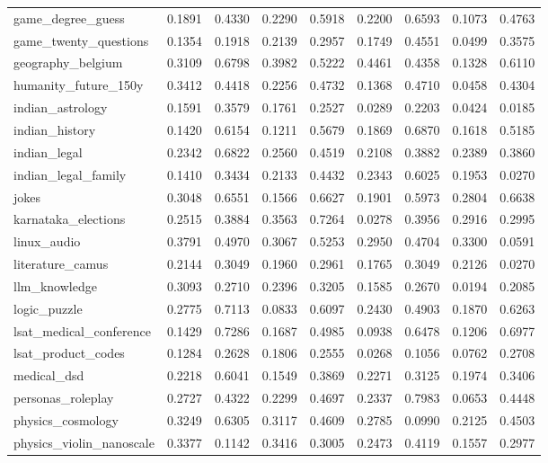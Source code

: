 \documentclass[pdflatex,sn-mathphys-num]{sn-jnl}%
\theoremstyle{thmstyleone}%
\theoremstyle{thmstyletwo}%
\theoremstyle{thmstylethree}%
\begin{document}
\begin{appendices}
\begin{landscape}
\begin{longtable}{@{}p{3.8cm}cccccccc@{}}
game\_degree\_guess & 0.1891 & 0.4330 & 0.2290 & 0.5918 & 0.2200 & 0.6593 & 0.1073 & 0.4763 \\
game\_twenty\_questions & 0.1354 & 0.1918 & 0.2139 & 0.2957 & 0.1749 & 0.4551 & 0.0499 & 0.3575 \\
geography\_belgium & 0.3109 & 0.6798 & 0.3982 & 0.5222 & 0.4461 & 0.4358 & 0.1328 & 0.6110 \\
humanity\_future\_150y & 0.3412 & 0.4418 & 0.2256 & 0.4732 & 0.1368 & 0.4710 & 0.0458 & 0.4304 \\
indian\_astrology & 0.1591 & 0.3579 & 0.1761 & 0.2527 & 0.0289 & 0.2203 & 0.0424 & 0.0185 \\
indian\_history & 0.1420 & 0.6154 & 0.1211 & 0.5679 & 0.1869 & 0.6870 & 0.1618 & 0.5185 \\
indian\_legal & 0.2342 & 0.6822 & 0.2560 & 0.4519 & 0.2108 & 0.3882 & 0.2389 & 0.3860 \\
indian\_legal\_family & 0.1410 & 0.3434 & 0.2133 & 0.4432 & 0.2343 & 0.6025 & 0.1953 & 0.0270 \\
jokes & 0.3048 & 0.6551 & 0.1566 & 0.6627 & 0.1901 & 0.5973 & 0.2804 & 0.6638 \\
karnataka\_elections & 0.2515 & 0.3884 & 0.3563 & 0.7264 & 0.0278 & 0.3956 & 0.2916 & 0.2995 \\
linux\_audio & 0.3791 & 0.4970 & 0.3067 & 0.5253 & 0.2950 & 0.4704 & 0.3300 & 0.0591 \\
literature\_camus & 0.2144 & 0.3049 & 0.1960 & 0.2961 & 0.1765 & 0.3049 & 0.2126 & 0.0270 \\
llm\_knowledge & 0.3093 & 0.2710 & 0.2396 & 0.3205 & 0.1585 & 0.2670 & 0.0194 & 0.2085 \\
logic\_puzzle & 0.2775 & 0.7113 & 0.0833 & 0.6097 & 0.2430 & 0.4903 & 0.1870 & 0.6263 \\
lsat\_medical\_conference & 0.1429 & 0.7286 & 0.1687 & 0.4985 & 0.0938 & 0.6478 & 0.1206 & 0.6977 \\
lsat\_product\_codes & 0.1284 & 0.2628 & 0.1806 & 0.2555 & 0.0268 & 0.1056 & 0.0762 & 0.2708 \\
medical\_dsd & 0.2218 & 0.6041 & 0.1549 & 0.3869 & 0.2271 & 0.3125 & 0.1974 & 0.3406 \\
personas\_roleplay & 0.2727 & 0.4322 & 0.2299 & 0.4697 & 0.2337 & 0.7983 & 0.0653 & 0.4448 \\
physics\_cosmology & 0.3249 & 0.6305 & 0.3117 & 0.4609 & 0.2785 & 0.0990 & 0.2125 & 0.4503 \\
physics\_violin\_nanoscale & 0.3377 & 0.1142 & 0.3416 & 0.3005 & 0.2473 & 0.4119 & 0.1557 & 0.2977 \\

\end{longtable}
\end{landscape}
\end{appendices}
\end{document}
